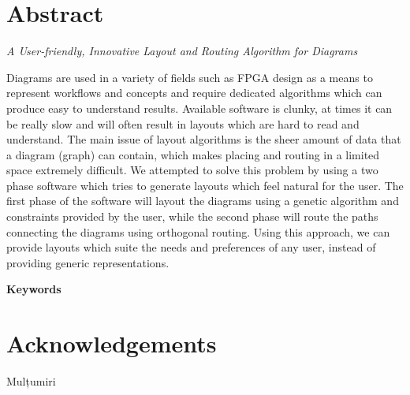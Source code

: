 \chapter*{Abstract}

\emph{A User-friendly, Innovative Layout and Routing Algorithm for Diagrams }

\vspace{\baselineskip}

Diagrams are used in a variety of fields such as FPGA design as a means to represent workflows and concepts and require dedicated algorithms which can produce easy to understand results. 
Available software is clunky, at times it can be really slow and will often result in layouts which are hard to read and understand. The main issue of layout algorithms is the sheer amount 
of data that a diagram (graph) can contain, which makes placing and routing in a limited space extremely difficult. We attempted to solve this problem by using a two phase software which tries 
to generate layouts which feel natural for the user. The first phase of the software will layout the diagrams using a genetic algorithm and constraints provided by the user, while the second 
phase will route the paths connecting the diagrams using orthogonal routing. Using this approach, we can provide layouts which suite the needs and preferences of any user, instead of providing 
generic representations.

\vspace{\baselineskip}
\textbf{Keywords} 

\chapter*{Acknowledgements}

Mulțumiri 
